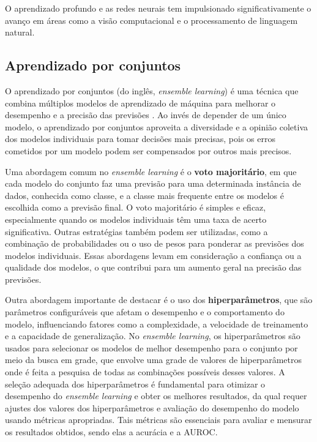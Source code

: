O aprendizado profundo e as redes neurais tem impulsionado significativamente o avanço em áreas como a visão computacional e o processamento de linguagem natural.

\subsection{Aprendizado por conjuntos}

O aprendizado por conjuntos (do inglês, \textit{ensemble learning}) é uma técnica que combina múltiplos modelos de aprendizado de máquina para melhorar o desempenho e a precisão das previsões \cite{OPITZEnsemble}. Ao invés de depender de um único modelo, o aprendizado por conjuntos aproveita a diversidade e a opinião coletiva dos modelos individuais para tomar decisões mais precisas, pois os erros cometidos por um modelo podem ser compensados por outros mais precisos. 

Uma abordagem comum no \textit{ensemble learning} é o \textbf{voto majoritário}, em que cada modelo do conjunto faz uma previsão para uma determinada instância de dados, conhecida como classe, e a classe mais frequente entre os modelos é escolhida como a previsão final. O voto majoritário é simples e eficaz, especialmente quando os modelos individuais têm uma taxa de acerto significativa. Outras estratégias também podem ser utilizadas, como a combinação de probabilidades ou o uso de pesos para ponderar as previsões dos modelos individuais. Essas abordagens levam em consideração a confiança ou a qualidade dos modelos, o que contribui para um aumento geral na precisão das previsões.

Outra abordagem importante de destacar é o uso dos \textbf{hiperparâmetros}, que são parâmetros configuráveis que afetam o desempenho e o comportamento do modelo, influenciando fatores como a complexidade, a velocidade de treinamento e a capacidade de generalização. No \textit{ensemble learning}, os hiperparâmetros são usados para selecionar os modelos de melhor desempenho para o conjunto por meio da busca em grade, que envolve uma grade de valores de hiperparâmetros onde é feita a pesquisa de todas as combinações possíveis desses valores. A seleção adequada dos hiperparâmetros é fundamental para otimizar o desempenho do \textit{ensemble learning} e obter os melhores resultados, da qual requer ajustes dos valores dos hiperparâmetros e avaliação do desempenho do modelo usando métricas apropriadas. Tais métricas são essenciais para avaliar e mensurar os resultados obtidos, sendo elas a acurácia e a AUROC.

